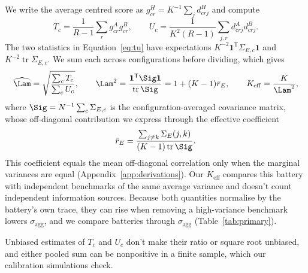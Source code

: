 We write the average centred score as $g^H_{cr}=K^{-1}\sum_j d^H_{crj}$ and compute
\begin{equation}
T_c=\frac{1}{R-1}\sum_r g^A_{cr}g^B_{cr},\qquad
U_c=\frac{1}{K^2(R-1)}\sum_{j,r}d^A_{crj}d^B_{crj}.
\label{eq:tu}
\end{equation}
The two statistics in Equation~\ref{eq:tu} have expectations $K^{-2}\mathbf{1}^{\mathsf T}\Sigma_{E,c}\mathbf{1}$ and $K^{-2}\operatorname{tr}\Sigma_{E,c}$. We sum each across configurations before dividing, which gives
\begin{equation}
\widehat\Lam=\sqrt{\frac{\sum_c T_c}{\sum_c U_c}},\qquad
\Lam^2=\frac{\mathbf{1}^{\mathsf T}\Sig\mathbf{1}}{\operatorname{tr}\Sig}
=1+(K-1)\bar r_E,\qquad K_{\mathrm{eff}}=\frac{K}{\Lam^2},
\label{eq:lambda}
\end{equation}
where $\Sig=N^{-1}\sum_c\Sigma_{E,c}$ is the configuration-averaged covariance matrix, whose off-diagonal contribution we express through the effective coefficient
\begin{equation}
\bar r_E=\frac{\sum_{j\ne k}\Sigma_E(j,k)}{(K-1)\operatorname{tr}\Sig}.
\end{equation}
This coefficient equals the mean off-diagonal correlation only when the marginal variances are equal (Appendix~\ref{app:derivations}). Our $K_{\mathrm{eff}}$ compares this battery with independent benchmarks of the same average variance and doesn't count independent information sources. Because both quantities normalise by the battery's own trace, they can rise when removing a high-variance benchmark lowers $\sigma_{\mathrm{agg}}$, and we compare batteries through $\sigma_{\mathrm{agg}}$ (Table~\ref{tab:primary}).

Unbiased estimates of $T_c$ and $U_c$ don't make their ratio or square root unbiased, and either pooled sum can be nonpositive in a finite sample, which our calibration simulations check.

